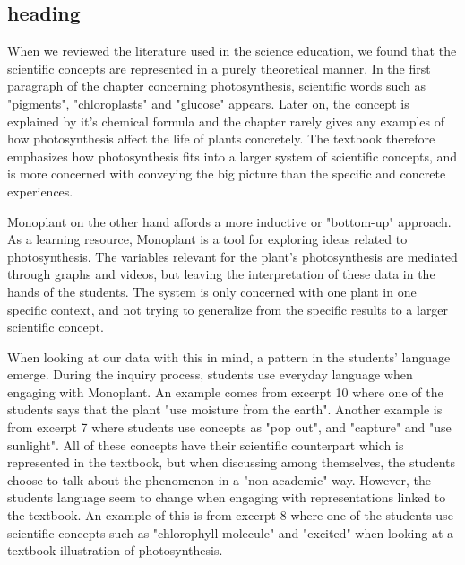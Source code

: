 \subsection{heading}
When we reviewed the literature used in the science education, we found that the scientific concepts are represented in a purely theoretical manner. In the first paragraph of the chapter concerning photosynthesis, scientific words such as "pigments", "chloroplasts" and "glucose" appears. Later on, the concept is explained by it's chemical formula and the chapter rarely gives any examples of how photosynthesis affect the life of plants concretely. The textbook therefore emphasizes how photosynthesis fits into a larger system of scientific concepts, and is more concerned with conveying the big picture than the specific and concrete experiences. 

Monoplant on the other hand affords a more inductive or "bottom-up" approach. As a learning resource, Monoplant is a tool for exploring ideas related to photosynthesis. The variables relevant for the plant's photosynthesis are mediated through graphs and videos, but leaving the interpretation of these data in the hands of the students. The system is only concerned with one plant in one specific context, and not trying to generalize from the specific results to a larger scientific concept. 

When looking at our data with this in mind, a pattern in the students' language emerge. During the inquiry process, students use everyday language when engaging with Monoplant. An example comes from excerpt 10 where one of the students says that the plant "use moisture from the earth". Another example is from excerpt 7 where students use concepts as "pop out", and "capture" and "use sunlight". All of these concepts have their scientific counterpart which is represented in the textbook, but when discussing among themselves, the students choose to talk about the phenomenon in a "non-academic" way. However, the students language seem to change when engaging with representations linked to the textbook. An example of this is from excerpt 8 where one of the students use scientific concepts such as "chlorophyll molecule" and "excited" when looking at a textbook illustration of photosynthesis. 

